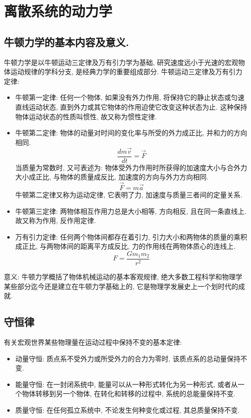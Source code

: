 \documentclass[a4paper,titlepage,twocolumn]{article}
\begin{document}
\section{离散系统的动力学}
\subsection{牛顿力学的基本内容及意义.}
牛顿力学是以牛顿运动三定律及万有引力学为基础, 研究速度远小于光速的宏观物体运动规律的学科分支, 是经典力学的重要组成部分. 牛顿运动三定律及万有引力定律:
\begin{itemize}
\item 牛顿第一定律: 任何一个物体, 如果没有外力作用, 将保持它的静止状态或匀速直线运动状态, 直到外力或其它物体的作用迫使它改变这种状态为止. 这种保持物体运动状态的性质叫惯性, 故又称为惯性定律.
\item 牛顿第二定律: 物体的动量对时间的变化率与所受的外力成正比, 并和力的方向相同. 
\[
\frac{d m\vec{v}}{dt} = \vec{F}
\]
当质量为常数时, 又可表述为: 物体受外力作用时所获得的加速度大小与合外力大小成正比, 与物体的质量成反比, 加速度的方向与外力方向相同. 
\[
\vec{F} = m\vec{a}
\]
牛顿第二定律又称为运动定律, 它表明了力, 加速度与质量三者间的定量关系.
\item 牛顿第三定律: 两物体相互作用力总是大小相等, 方向相反, 且在同一条直线上. 故又称为作用, 反作用定律.

\item 万有引力定律: 任何两个物体间都存在着引力, 引力大小和两物体的质量的乘积成正比, 与两物体间的距离平方成反比, 力的作用线在两物体质心的连线上.
\[
F = \frac{Gm_1m_2}{r^2}
\]
\end{itemize}
意义: 牛顿力学概括了物体机械运动的基本客观规律, 绝大多数工程科学和物理学某些部分迄今还是建立在牛顿力学基础上的, 它是物理学发展史上一个划时代的成就.

\subsection{守恒律}
有关宏观世界某些物理量在运动过程中保持不变的基本定律:
\begin{itemize}
\item 动量守恒: 质点系不受外力或所受外力的合力为零时, 该质点系的总动量保持不变.
\item 能量守恒: 在一封闭系统中, 能量可以从一种形式转化为另一种形式, 或者从一个物体转移到另一个物体, 在转化和转移的过程中, 系统的总能量保持不变.
\item 质量守恒: 在任何孤立系统中, 不论发生何种变化或过程, 其总质量保持不变.
\end{itemize}
\end{document}

